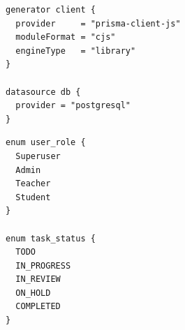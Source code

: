 \begin{listing}[H]
\begin{verbatim}
generator client {
  provider     = "prisma-client-js"
  moduleFormat = "cjs"
  engineType   = "library"
}

datasource db {
  provider = "postgresql"
}
\end{verbatim}
\caption{Prisma -- Generator und Datasource}
\label{lst:prisma_generator}
\end{listing}

\begin{listing}[H]
\begin{verbatim}
enum user_role {
  Superuser
  Admin
  Teacher
  Student
}

enum task_status {
  TODO
  IN_PROGRESS
  IN_REVIEW
  ON_HOLD
  COMPLETED
}
\end{verbatim}
\caption{Prisma -- Enumerationen \texttt{user\_role} und \texttt{task\_status}}
\label{lst:prisma_enums}
\end{listing}

